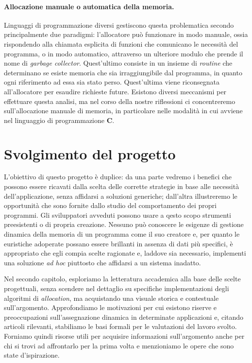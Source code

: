 \paragraph{Allocazione manuale o automatica della memoria.}
Linguaggi di programmazione diversi gestiscono questa problematica secondo principalmente due paradigmi: l'allocatore può funzionare in modo manuale, ossia rispondendo alla chiamata esplicita di funzioni che comunicano le necessità del programma, o in modo automatico, attraverso un ulteriore modulo che prende il nome di \textit{garbage collector}. Quest'ultimo consiste in un insieme di \textit{routine} che determinano se esiste memoria che sia irraggiungibile dal programma, in quanto ogni riferimento ad essa sia stato perso. Quest'ultima viene riconsegnata all'allocatore per esaudire richieste future. Esistono diversi meccanismi per effettuare questa analisi, ma nel corso della nostre riflessioni ci concentreremo sull'allocazione manuale di memoria, in particolare nelle modalità in cui avviene nel linguaggio di programmazione \textbf{C}. 

\section{Svolgimento del progetto}
L'obiettivo di questo progetto è duplice: da una parte vedremo i benefici che possono essere ricavati dalla scelta delle corrette strategie in base alle necessità dell'applicazione, senza affidarsi a soluzioni generiche; dall'altra illustreremo le opportunità che sono fornite dallo studio del comportamento dei propri programmi. Gli sviluppatori avveduti possono usare a qesto scopo strumenti preesistenti o di propria creazione. Nessuno può conoscere le esigenze di gestione dinamica della memoria di un programma come il suo creatore e, per quanto le euristiche adoperate possano essere brillanti in assenza di dati più specifici, è appropriato che egli compia scelte ragionate e, laddove sia necessario, implementi una soluzione \textit{ad hoc} piuttosto che affidarsi a un sistema inadatto.

Nel secondo capitolo, esploriamo la letteratura accademica alla base delle scelte progettuali, senza scendere nel dettaglio su specifiche implementazioni degli algoritmi di \textit{allocation}, ma acquistando una visuale storica e contestuale sull'argomento. Approfondiamo le motivazioni per cui esistono riserve e preoccupazioni sull'assegnazione dinamica in determinate applicazioni e, citando articoli rilevanti, stabiliamo le basi formali per le valutazioni del lavoro svolto. Forniamo quindi risorse utili per acquisire informazioni sull'argomento anche per chi si trovi ad affrontarlo per la prima volta e menzioniamo le opere che sono state d'ispirazione. 

